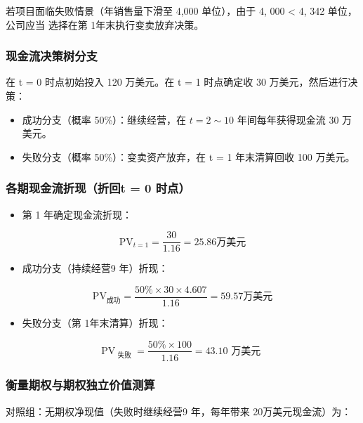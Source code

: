 \documentclass[lang=cn,10pt,color=blue]{elegantbook}
\begin{document}
若项目面临失败情景（年销售量下滑至 4,000 单位），由于 4, 000 < 4, 342 单位，公司应当 选择在第 1年末执行变卖放弃决策。 

\subsubsection{现金流决策树分支}

在 t = 0 时点初始投入 120 万美元。在 t = 1 时点确定收 30 万美元，然后进行决策： 

\begin{itemize}
  \item 成功分支（概率 50\%）：继续经营，在 $t = 2 \sim 10$ 年间每年获得现金流 30 万美元。

  \item 失败分支（概率 50\%）：变卖资产放弃，在 t = 1 年末清算回收 100 万美元。
\end{itemize}

\subsubsection{各期现金流折现（折回t = 0 时点）}

\begin{itemize}
  \item 第 1 年确定现金流折现：
\end{itemize}

$$
\mathrm{PV} _ {t = 1} = \frac {3 0}{1 . 1 6} = 2 5. 8 6 \text {万美元}
$$

\begin{itemize}
  \item 成功分支（持续经营9 年）折现：
\end{itemize}

$$
\mathrm{PV} _ {\text {成功}} = \frac {50 \% \times 3 0 \times 4 . 6 0 7}{1 . 1 6} = 5 9. 5 7 \text {万美元}
$$

\begin{itemize}
  \item 失败分支（第 1年末清算）折现：
\end{itemize}

$$
\mathrm{PV} _ {\text { 失败 }} = \frac {50 \% \times 100}{1.16} = 43.10 \text { 万美元 }
$$

\subsubsection{衡量期权与期权独立价值测算}

对照组：无期权净现值（失败时继续经营9 年，每年带来 20万美元现金流）为： 
\end{document}
